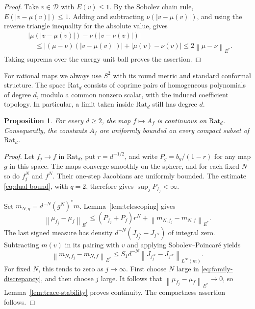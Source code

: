 \documentclass[11pt,reqno]{amsart}
\theoremstyle{plain}
\newtheorem{proposition}[theorem]{Proposition}
\theoremstyle{definition}
\theoremstyle{remark}
\newcommand{\Dcal}{\mathcal D}
\newcommand{\norm}[1]{\left\lVert #1\right\rVert}
\numberwithin{equation}{section}
\begin{document}
\begin{proof}
Take $v\in\Dcal$ with $E(v)\le1$. By the Sobolev chain rule, $E(|v-\mu(v)|)\le1$. Adding and subtracting $\nu(|v-\mu(v)|)$, and using the reverse triangle inequality for the absolute value, gives
\begin{align*}
 &\big|\mu(|v-\mu(v)|)-\nu(|v-\nu(v)|)\big|\\
 &\quad\le |(\mu-\nu)(|v-\mu(v)|)|+|\mu(v)-\nu(v)|
 \le2\norm{\mu-\nu}_{E^*}.
\end{align*}
Taking suprema over the energy unit ball proves the assertion.
\end{proof}

For rational maps we always use $S^2$ with its round metric and standard conformal structure. The space $\mathrm{Rat}_d$ consists of coprime pairs of homogeneous polynomials of degree $d$, modulo a common nonzero scalar, with the induced coefficient topology. In particular, a limit taken inside $\mathrm{Rat}_d$ still has degree $d$.

\begin{proposition}\label{prop:rational-continuity}
For every $d\ge2$, the map $f\mapsto A_f$ is continuous on $\mathrm{Rat}_d$. Consequently, the constants $A_f$ are uniformly bounded on every compact subset of $\mathrm{Rat}_d$.
\end{proposition}

\begin{proof}
Let $f_j\to f$ in $\mathrm{Rat}_d$, put $r=d^{-1/2}$, and write $P_g=b_g/(1-r)$ for any map $g$ in this space. The maps converge smoothly on the sphere, and for each fixed $N$ so do $f_j^N$ and $f^N$. Their one-step Jacobians are uniformly bounded. The estimate \eqref{eq:dual-bound}, with $q=2$, therefore gives $\sup_j P_{f_j}<\infty$.

Set $m_{N,g}=d^{-N}(g^N)^*m$. Lemma~\ref{lem:telescoping} gives
\begin{equation}\label{eq:family-discrepancy}
 \norm{\mu_{f_j}-\mu_f}_{E^*}
 \le (P_{f_j}+P_f)r^N
       +\norm{m_{N,f_j}-m_{N,f}}_{E^*}.
\end{equation}
The last signed measure has density $d^{-N}(J_{f_j^N}-J_{f^N})$ of integral zero. Subtracting $m(v)$ in its pairing with $v$ and applying Sobolev--Poincar\'e yields
\[
 \norm{m_{N,f_j}-m_{N,f}}_{E^*}
 \le S_1d^{-N}\norm{J_{f_j^N}-J_{f^N}}_{L^\infty(m)}.
\]
For fixed $N$, this tends to zero as $j\to\infty$. First choose $N$ large in \eqref{eq:family-discrepancy}, and then choose $j$ large. It follows that $\norm{\mu_{f_j}-\mu_f}_{E^*}\to0$, so Lemma~\ref{lem:trace-stability} proves continuity. The compactness assertion follows.
\end{proof}
\end{document}
